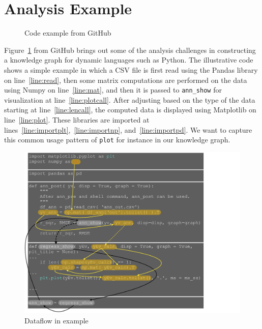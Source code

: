 \section{Analysis Example}
\label{sec:example}

\begin{figure}[htb]
\centering 
{\renewcommand\thelstnumber{%
\ifnum\value{lstnumber}>29\relax \the\numexpr  
278+\value{lstnumber}\relax\else 
\ifnum\value{lstnumber}>25\relax \the\numexpr  
139+\value{lstnumber}\relax\else 
\ifnum\value{lstnumber}>22\relax \the\numexpr  
132+\value{lstnumber}\relax\else 
\ifnum\value{lstnumber}>20\relax \the\numexpr  
130+\value{lstnumber}\relax\else 
\ifnum\value{lstnumber}>7\relax \the\numexpr  
92+\value{lstnumber}\relax\else 
\the\numexpr  
6+\value{lstnumber}\fi\fi\fi\fi\fi}
}
\caption{Code example from GitHub}
\label{running_example}
\end{figure}

Figure~\ref{running_example} from GitHub brings out some of the analysis  
challenges in constructing a knowledge graph for dynamic languages such as Python.  
The illustrative code shows a simple example in which a CSV file is  
first read using the Pandas library on line~\ref{line:read}, then some  
matrix computations are performed on the data using Numpy on  
line~\ref{line:mat}, and then it is passed to {\tt ann\_show} for  
visualization at line~\ref{line:plotcall}.  After adjusting based on  
the type of the data starting at line~\ref{line:lencall}, the computed data is  
displayed using Matplotlib on line~\ref{line:plot}.  These libraries  
are imported at lines~\ref{line:importplt},~\ref{line:importnp}, and~\ref{line:importpd}.  We want to  
capture this common usage pattern of {\tt plot} for instance in our knowledge  
graph. 

\begin{figure}[htb]
\begin{center}
\includegraphics[width=5in]{paper_figures/example_flow}
\end{center}
\caption{Dataflow in example}
\label{fig:code_graph}
\end{figure}

